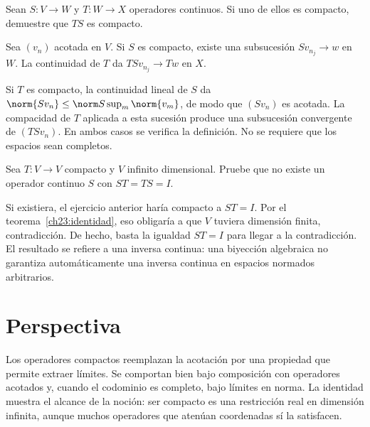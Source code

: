 \begin{ejercicio}
Sean $S:V\to W$ y $T:W\to X$ operadores continuos. Si uno de ellos es compacto, demuestre que $TS$ es compacto.
\end{ejercicio}
\begin{solucion}
Sea $(v_n)$ acotada en $V$. Si $S$ es compacto, existe una subsucesión $Sv_{n_j}\to w$ en $W$. La continuidad de $T$ da $TSv_{n_j}\to Tw$ en $X$.

Si $T$ es compacto, la continuidad lineal de $S$ da $\norm{Sv_n}\leq\norm S\sup_m\norm{v_m}$, de modo que $(Sv_n)$ es acotada. La compacidad de $T$ aplicada a esta sucesión produce una subsucesión convergente de $(TSv_n)$. En ambos casos se verifica la definición. No se requiere que los espacios sean completos.
\end{solucion}

\begin{ejercicio}
Sea $T:V\to V$ compacto y $V$ infinito dimensional. Pruebe que no existe un operador continuo $S$ con $ST=TS=I$.
\end{ejercicio}
\begin{solucion}
Si existiera, el ejercicio anterior haría compacto a $ST=I$. Por el teorema~\ref{ch23:identidad}, eso obligaría a que $V$ tuviera dimensión finita, contradicción. De hecho, basta la igualdad $ST=I$ para llegar a la contradicción. El resultado se refiere a una inversa continua: una biyección algebraica no garantiza automáticamente una inversa continua en espacios normados arbitrarios.
\end{solucion}

\section{Perspectiva}
Los operadores compactos reemplazan la acotación por una propiedad que permite extraer límites. Se comportan bien bajo composición con operadores acotados y, cuando el codominio es completo, bajo límites en norma. La identidad muestra el alcance de la noción: ser compacto es una restricción real en dimensión infinita, aunque muchos operadores que atenúan coordenadas sí la satisfacen.
